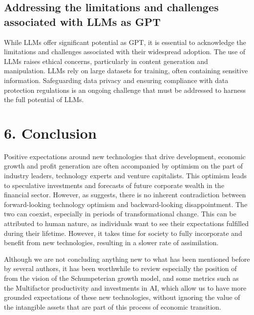 \documentclass[preprint, 3p,
authoryear]{elsarticle} %
\begin{document}
\hypertarget{addressing-the-limitations-and-challenges-associated-with-llms-as-gpt}{%
\subsection{Addressing the limitations and challenges associated with
LLMs as
GPT}\label{addressing-the-limitations-and-challenges-associated-with-llms-as-gpt}}

While LLMs offer significant potential as GPT, it is essential to
acknowledge the limitations and challenges associated with their
widespread adoption. The use of LLMs raises ethical concerns,
particularly in content generation and manipulation. LLMs rely on large
datasets for training, often containing sensitive information.
Safeguarding data privacy and ensuring compliance with data protection
regulations is an ongoing challenge that must be addressed to harness
the full potential of LLMs.

\hypertarget{conclusion}{%
\section{6. Conclusion}\label{conclusion}}

Positive expectations around new technologies that drive development,
economic growth and profit generation are often accompanied by optimism
on the part of industry leaders, technology experts and venture
capitalists. This optimism leads to speculative investments and
forecasts of future corporate wealth in the financial sector. However,
as \citep{paradox} suggests, there is no inherent contradiction between
forward-looking technology optimism and backward-looking disappointment.
The two can coexist, especially in periods of transformational change.
This can be attributed to human nature, as individuals want to see their
expectations fulfilled during their lifetime. However, it takes time for
society to fully incorporate and benefit from new technologies,
resulting in a slower rate of assimilation.

Although we are not concluding anything new to what has been mentioned
before by several authors, it has been worthwhile to review especially
the position of \citep{paradox} from the vision of the Schumpeterian
growth model, and some metrics such as the Multifactor productivity and
investments in AI, which allow us to have more grounded expectations of
these new technologies, without ignoring the value of the intangible
assets that are part of this process of economic transition.

\renewcommand\refname{References}

\end{document}
